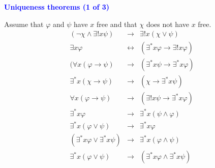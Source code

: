 \documentclass{slides}
\begin{document}
\begin{slide}

\begin{center}
\textcolor{blue}{\textbf{Uniqueness theorems (1 of 3)}}
\end{center}

Assume that $\varphi$ and $\psi$ have $x$
free and that $\chi$ does not have $x$ free.
\begin{eqnarray}
 ( \lnot \chi \wedge \exists{!} x \psi ) & \rightarrow & \exists{!} x (
\chi \vee \psi ) \label{euorv} \\ %
 \exists x \varphi & \leftrightarrow & ( \exists^\ast x \varphi \rightarrow
\exists{!} x \varphi ) \label{exmoeu} \\ %
   ( \forall x ( \varphi \rightarrow \psi ) & \rightarrow & ( \exists^\ast x
\psi \rightarrow \exists^\ast x \varphi ) \label{immo} \\ %
   \exists^\ast x ( \chi \rightarrow \psi ) & \rightarrow & ( \chi
\rightarrow \exists^\ast x \psi ) \label{moimv} \\ %
  \forall x ( \varphi \rightarrow \psi ) & \rightarrow & ( \exists{!} x \psi
\rightarrow \exists^\ast x \varphi ) \label{euimmo} \\ %
   \exists^\ast x \varphi & \rightarrow & \exists^\ast x ( \psi \wedge
\varphi ) \label{moan} \\ %
   \exists^\ast x ( \varphi \vee \psi ) & \rightarrow & \exists^\ast x
\varphi \label{moor} \\ %
    ( \exists^\ast x \varphi \vee \exists^\ast x \psi ) & \rightarrow &
\exists^\ast x ( \varphi \wedge \psi ) \label{mooran1} \\ %
     \exists^\ast x ( \varphi \vee \psi ) & \rightarrow & ( \exists^\ast x
\varphi \wedge \exists^\ast x \psi ) \label{mooran2}  %
\end{eqnarray}


\end{slide}
\end{document}
